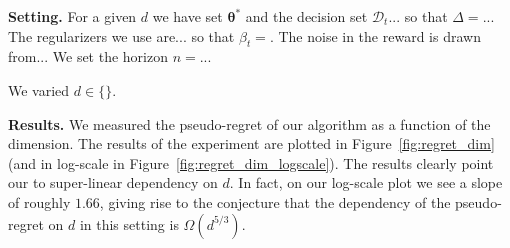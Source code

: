 \documentclass{article}
\renewcommand{\vec}[1]{\bm{#1}}
\newcommand{\D}{\mathcal{D}}
\renewcommand{\paragraph}[1]{\vspace{2pt}\noindent\textbf{#1}}
\begin{document}
\paragraph{Setting.} For a given $d$ we have set $\vec\theta^*$ and the decision set $\D_t$... so that $\Delta = $... The regularizers we use are... so that $\beta_t=$. The noise in the reward is drawn from... We set the horizon $n = $...  

We varied $d \in \{ \}$.

\paragraph{Results.} We measured the pseudo-regret of our algorithm as a function of the dimension. The results of the experiment are plotted in Figure~\ref{fig:regret_dim} (and in log-scale in Figure~\ref{fig:regret_dim_logscale}). The results clearly point our to super-linear dependency on $d$. In fact, on our log-scale plot we see a slope of roughly $1.66$, giving rise to the conjecture that the dependency of the pseudo-regret on $d$ in this setting is $\Omega(d^{5/3})$.
\end{document}
